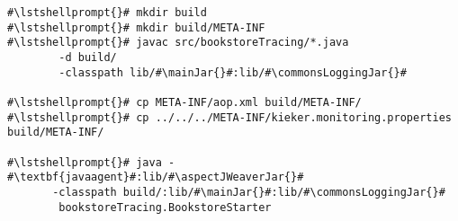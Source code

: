 \begin{lstlisting}[caption=Commands to compile and run the Bookstore under \UnixLikeSystems, label=lst:traceAnalysisCompileRunExample1]
#\lstshellprompt{}# mkdir build
#\lstshellprompt{}# mkdir build/META-INF
#\lstshellprompt{}# javac src/bookstoreTracing/*.java
        -d build/ 
        -classpath lib/#\mainJar{}#:lib/#\commonsLoggingJar{}#

#\lstshellprompt{}# cp META-INF/aop.xml build/META-INF/
#\lstshellprompt{}# cp ../../../META-INF/kieker.monitoring.properties build/META-INF/

#\lstshellprompt{}# java -#\textbf{javaagent}#:lib/#\aspectJWeaverJar{}# 
       -classpath build/:lib/#\mainJar{}#:lib/#\commonsLoggingJar{}#
        bookstoreTracing.BookstoreStarter
\end{lstlisting}
